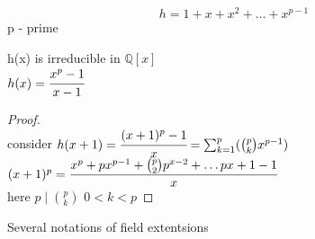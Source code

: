\documentclass{article}
\begin{document}
$$h = 1 + x + x^2 + \dots + x^{p-1}$$ p - prime
\begin{proposition}
    h(x) is irreducible in $\mathbb{Q}[x]$ \\ 
    $h(x) = \cfrac{x^p - 1}{x - 1} $\\ 
    \begin{proof}
        \leavevmode \\ 
        consider $h(x+1) = \cfrac{(x+1)^p - 1}{x} = \sum_{k =1 }^p(\binom{p}{k}x^{p-1})$ \\ 
        $(x+1)^p = \cfrac{x^p + px^{p-1} + \binom{p}{2}p^{x-2} + \dots px + 1 - 1} {x}$ \\ 
        here $p \mid \binom{p}{k}$ $0 < k < p$
    \end{proof}

\end{proposition}


Several notations of field extentsions 
\end{document}
